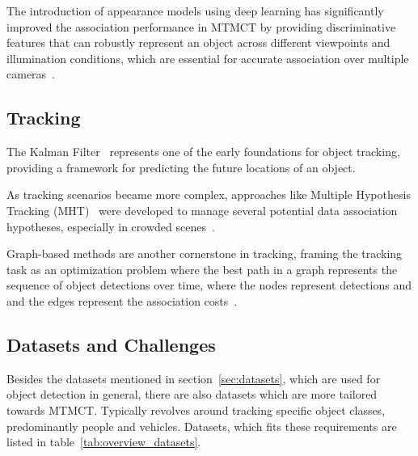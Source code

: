 The introduction of appearance models using deep learning has significantly improved the association performance in MTMCT by providing discriminative features that can robustly represent an object across different viewpoints and illumination conditions, which are essential for accurate association over multiple cameras~\cite{Schroff15, Zheng16c}.

\subsection{Tracking}\label{subsec:milestone_tracking}
The Kalman Filter~\cite{Kalman60} represents one of the early foundations for object tracking, providing a framework for predicting the future locations of an object.

As tracking scenarios became more complex, approaches like Multiple Hypothesis Tracking (MHT)~\cite{Blackman04} were developed to manage several potential data association hypotheses, especially in crowded scenes~\cite{Reid79}.

Graph-based methods are another cornerstone in tracking, framing the tracking task as an optimization problem where the best path in a graph represents the sequence of object detections over time, where the nodes represent detections and and the edges represent the association costs~\cite{Zhang08}.

\subsection{Datasets and Challenges}\label{subsec:datasets_and_challenges}
Besides the datasets mentioned in section~\ref{sec:datasets}, which are used for object detection in general, there are also datasets which are more tailored towards MTMCT. Typically revolves around tracking specific object classes, predominantly people and vehicles. Datasets, which fits these requirements are listed in table~\ref{tab:overview_datasets}.

